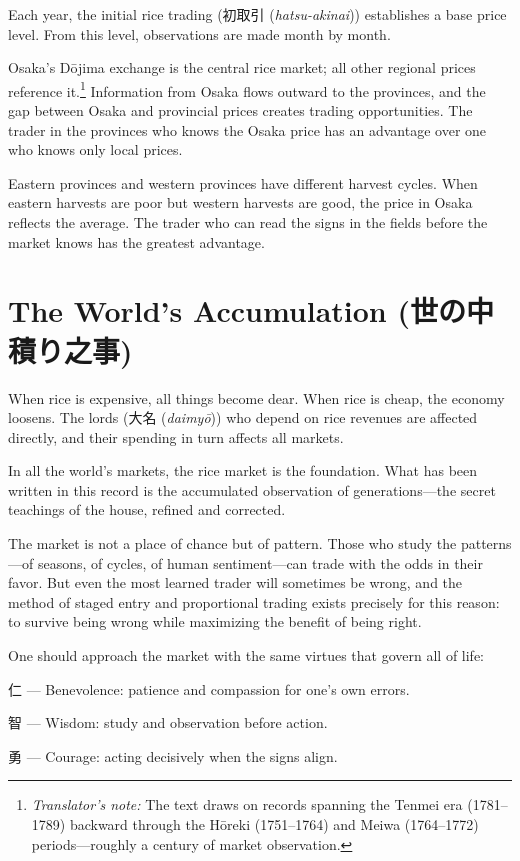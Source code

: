 \documentclass[10pt, openany]{book}
\newcommand{\jp}[1]{{\japanesefont #1}}
\newcommand{\tn}[1]{\footnote{\textit{Translator's note:} #1}}
\newcommand{\jt}[2]{\jp{#1} (\textit{#2})}
\begin{document}
Each year, the initial rice trading (\jt{初取引}{hatsu-akinai}) establishes
a base price level. From this level, observations are made month by month.

Osaka's D\=ojima exchange is the central rice market; all other regional
prices reference it.\tn{The text draws on records spanning the Tenmei era
(1781--1789) backward through the H\=oreki (1751--1764) and Meiwa
(1764--1772) periods---roughly a century of market observation.}
Information from Osaka flows outward to the provinces, and the gap between
Osaka and provincial prices creates trading opportunities. The trader in
the provinces who knows the Osaka price has an advantage over one who knows
only local prices.

Eastern provinces and western provinces have different harvest cycles. When
eastern harvests are poor but western harvests are good, the price in Osaka
reflects the average. The trader who can read the signs in the fields before
the market knows has the greatest advantage.

\section{The World's Accumulation (\jp{世の中積り之事})}

When rice is expensive, all things become dear. When rice is cheap, the
economy loosens. The lords (\jt{大名}{daimy\=o}) who depend on rice
revenues are affected directly, and their spending in turn affects all
markets.

In all the world's markets, the rice market is the foundation. What has
been written in this record is the accumulated observation of
generations---the secret teachings of the house, refined and corrected.

The market is not a place of chance but of pattern. Those who study the
patterns---of seasons, of cycles, of human sentiment---can trade with the
odds in their favor. But even the most learned trader will sometimes be
wrong, and the method of staged entry and proportional trading exists
precisely for this reason: to survive being wrong while maximizing the
benefit of being right.

One should approach the market with the same virtues that govern all of
life:

\jp{仁} --- Benevolence: patience and compassion for one's own errors.

\jp{智} --- Wisdom: study and observation before action.

\jp{勇} --- Courage: acting decisively when the signs align.
\end{document}
